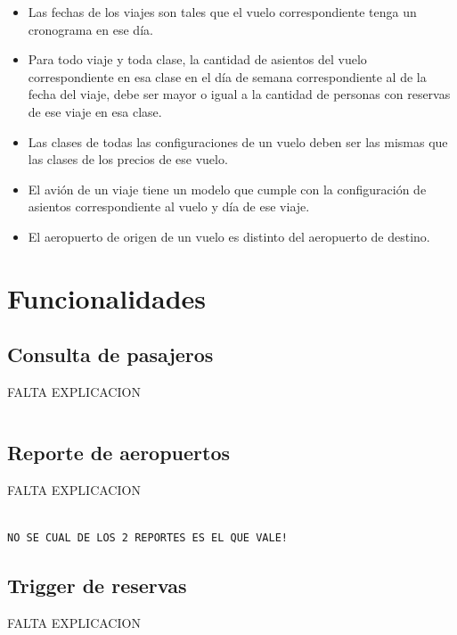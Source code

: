 \documentclass[a4paper,10pt]{article}
\begin{document}
\begin{itemize}

  \item Las fechas de los viajes son tales que el vuelo correspondiente tenga un cronograma en ese día.

  \item Para todo viaje y toda clase, la cantidad de asientos del vuelo correspondiente en esa clase en el día de semana correspondiente al de la fecha del viaje, debe ser mayor o igual a la cantidad de personas con reservas de ese viaje en esa clase.

  \item Las clases de todas las configuraciones de un vuelo deben ser las mismas que las clases de los precios de ese vuelo.

  \item El avión de un viaje tiene un modelo que cumple con la configuración de asientos correspondiente al vuelo y día de ese viaje.

  \item El aeropuerto de origen de un vuelo es distinto del aeropuerto de destino.

\end{itemize}

\newpage
\section{Funcionalidades}


\subsection{Consulta de pasajeros}

FALTA EXPLICACION

\begin{verbatim}

\end{verbatim}


\subsection{Reporte de aeropuertos}

FALTA EXPLICACION

\begin{verbatim}
 
NO SE CUAL DE LOS 2 REPORTES ES EL QUE VALE!

\end{verbatim}


\subsection{Trigger de reservas}

FALTA EXPLICACION

\begin{verbatim}
 

\end{verbatim}


\newpage
% 
\end{document}
